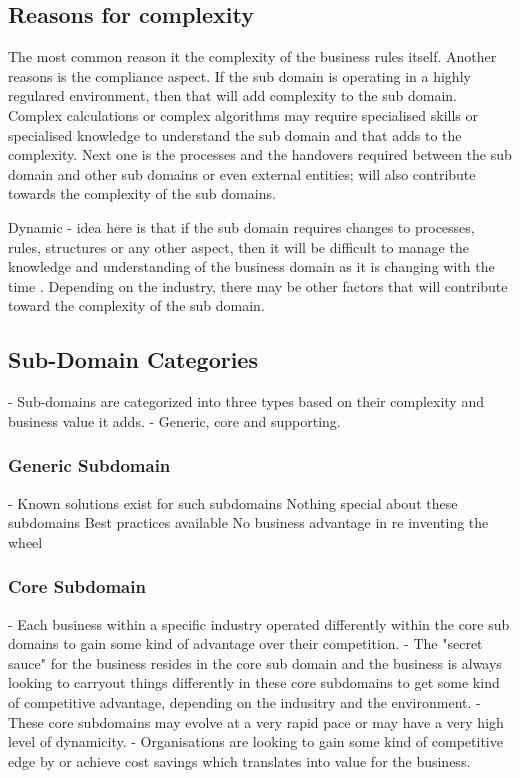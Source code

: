 \subsection{Reasons for complexity}
The most common reason it the complexity of the business rules itself.
Another reasons is the compliance aspect.
If the sub domain is operating in a highly regulared environment, then that will add complexity to the sub domain.
Complex calculations or complex algorithms may require specialised skills or specialised knowledge to understand the sub domain and that adds to the complexity.
Next one is the processes and the handovers required between the sub domain and other sub domains or even external entities; will also contribute towards the complexity of the sub domains.

Dynamic - idea here is that if the sub domain requires changes to processes, rules, structures or any other aspect, then it will be difficult to manage the knowledge and understanding of the business domain as it is changing with the time .
Depending on the industry, there may be other factors that will contribute toward the complexity of the sub domain.

\subsection{Sub-Domain Categories}
- Sub-domains are categorized into three types based on their complexity and business value it adds.
- Generic, core and supporting.

\subsubsection{Generic Subdomain}
- Known solutions exist for such subdomains
Nothing special about these subdomains
Best practices available
No business advantage in re inventing the wheel

\subsubsection{Core Subdomain}
- Each business within a specific industry operated differently within the core sub domains to gain some kind of advantage over their competition.
- The "secret sauce" for the business resides in the core sub domain and the business is always looking to carryout things differently in these core subdomains to get some kind of competitive advantage, depending on the indusitry and the environment.
- These core subdomains may evolve at a very rapid pace or may have a very high level of dynamicity.
- Organisations are looking to gain some kind of competitive edge by or achieve cost savings which translates into value for the business.

